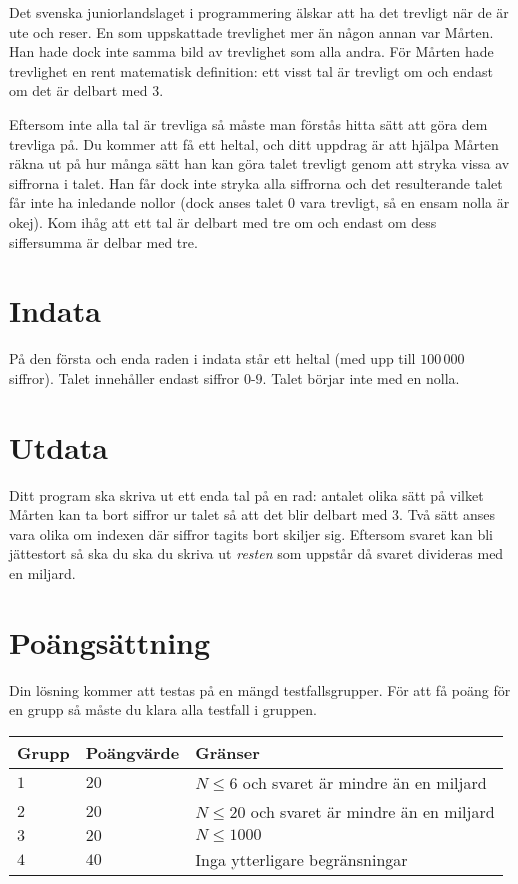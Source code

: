 Det svenska juniorlandslaget i programmering älskar att ha det trevligt när de
är ute och reser. En som uppskattade trevlighet mer än någon annan var Mårten.
Han hade dock inte samma bild av trevlighet som alla andra. För Mårten hade
trevlighet en rent matematisk definition: ett visst tal är trevligt om och
endast om det är delbart med 3.

Eftersom inte alla tal är trevliga så måste man förstås hitta sätt att göra dem
trevliga på. Du kommer att få ett heltal, och ditt uppdrag är att hjälpa Mårten
räkna ut på hur många sätt han kan göra talet trevligt genom att stryka vissa av
siffrorna i talet. Han får dock inte stryka alla siffrorna och det resulterande
talet får inte ha inledande nollor (dock anses talet $0$ vara trevligt, så en
ensam nolla är okej). Kom ihåg att ett tal är delbart med tre om
och endast om dess siffersumma är delbar med tre.

\section*{Indata}
På den första och enda raden i indata står ett heltal (med upp till $100\,000$
siffror). Talet innehåller endast siffror $0$-$9$. Talet börjar inte med en nolla.

\section*{Utdata}
Ditt program ska skriva ut ett enda tal på en rad: antalet olika sätt på vilket
Mårten kan ta bort siffror ur talet så att det blir delbart med $3$. Två sätt
anses vara olika om indexen där siffror tagits bort skiljer sig. Eftersom
svaret kan bli jättestort så ska du ska du skriva ut \emph{resten} som uppstår då svaret divideras med en miljard. 


\section*{Poängsättning}
Din lösning kommer att testas på en mängd testfallsgrupper.
För att få poäng för en grupp så måste du klara alla testfall i gruppen.

\noindent
\begin{tabular}{| l | l | l |}
  \hline
  Grupp & Poängvärde & Gränser \\ \hline
  $1$   & $20$       & $N \leq 6$ och svaret är mindre än en miljard \\ \hline
  $2$   & $20$       & $N \leq 20$ och svaret är mindre än en miljard \\ \hline
  $3$   & $20$       & $N \leq 1000$ \\ \hline
  $4$   & $40$       & Inga ytterligare begränsningar \\ \hline
\end{tabular}

